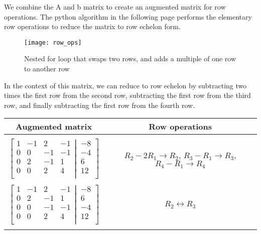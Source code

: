 \documentclass{article}
\begin{document}
        
        We combine the A and b matrix to create an augmented matrix for row operations. The python algorithm in the following page performs the elementary row operations to reduce the matrix to row echelon form.  
    
    \begin{figure}[h]
    \centering
    \texttt{[image: row\_ops]}
    \caption{Nested for loop that swaps two rows, and adds a multiple of one row to another row}
    \end{figure}
    
    In the context of this matrix, we can reduce to row echelon by subtracting two times the first row from the second row, subtracting the first row from the third row, and finally subtracting the first row from the fourth row. 
    
    \begin{table}[h]
    	\centering
    	\begin{tabular}{c|c}
    	
    	 Augmented matrix & Row operations
    	 \\ 
    	 \hline    	 
    	 \\
    
    	$\left[
  \begin{matrix}
    1 & -1 & 2 & -1\\  
 0 & 0 & -1 & -1\\
 0 & 2 & -1 & 1\\
 0 & 0 & 2 & 4 \\
  \end{matrix}
  \left|
    \,
    \begin{matrix}
      -8  \\
      -4  \\
      6  \\
      12  \\
    \end{matrix}
  \right.
\right]$ & $R_{2} - 2R_{1}  \rightarrow R_{2}$, 	 $R_{3} - R_{1}  \rightarrow R_{3}$, 	$R_{4} - R_{1}  \rightarrow R_{4}$
\\
\\	
    	$\left[
  \begin{matrix}
    1 & -1 & 2 & -1\\  
 0 & 2 & -1 & 1\\
 0 & 0 & -1 & -1\\
 0 & 0 & 2 & 4 \\
  \end{matrix}
  \left|
    \,
    \begin{matrix}
      -8  \\
      6  \\
      -4  \\
      12  \\
    \end{matrix}
  \right.
\right]$ & $R_{2}   \leftrightarrow  R_{3}$
\\
\\


\end{tabular}
\end{table}
\end{document}
